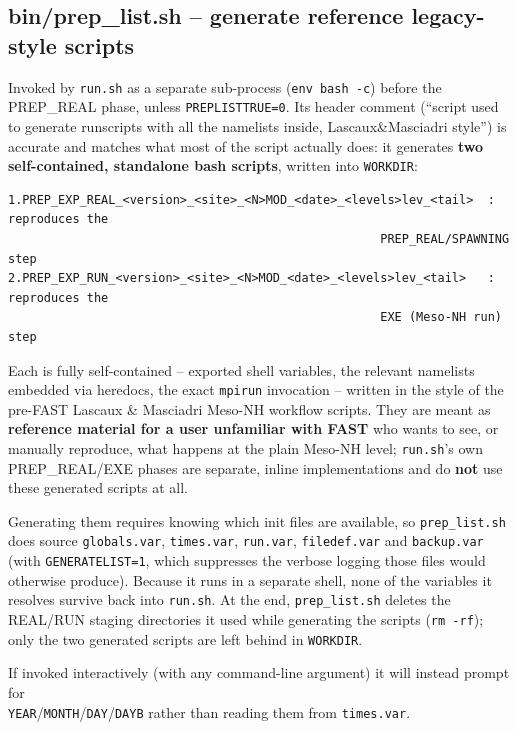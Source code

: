 \subsection{bin/prep\_list.sh -- generate reference legacy-style scripts}
Invoked by \texttt{run.sh} as a separate sub-process (\texttt{env bash -c}) before the PREP\_REAL phase,
unless \texttt{PREPLISTTRUE=0}. Its header comment (``script used to generate runscripts with all the
namelists inside, Lascaux\&Masciadri style'') is accurate and matches what most of the script actually
does: it generates \textbf{two self-contained, standalone bash scripts}, written into \texttt{WORKDIR}:
\begin{lstlisting}
1.PREP_EXP_REAL_<version>_<site>_<N>MOD_<date>_<levels>lev_<tail>  : reproduces the
                                                    PREP_REAL/SPAWNING step
2.PREP_EXP_RUN_<version>_<site>_<N>MOD_<date>_<levels>lev_<tail>   : reproduces the
                                                    EXE (Meso-NH run) step
\end{lstlisting}
Each is fully self-contained -- exported shell variables, the relevant namelists embedded via heredocs,
the exact \texttt{mpirun} invocation -- written in the style of the pre-FAST Lascaux \& Masciadri
Meso-NH workflow scripts. They are meant as \textbf{reference material for a user unfamiliar with FAST}
who wants to see, or manually reproduce, what happens at the plain Meso-NH level; \texttt{run.sh}'s own
PREP\_REAL/EXE phases are separate, inline implementations and do \textbf{not} use these generated
scripts at all.

Generating them requires knowing which init files are available, so \texttt{prep\_list.sh} does source
\texttt{globals.var}, \texttt{times.var}, \texttt{run.var}, \texttt{filedef.var} and \texttt{backup.var}
(with \texttt{GENERATELIST=1}, which suppresses the verbose logging those files would otherwise
produce). Because it runs in a separate shell, none of the variables it resolves survive back into \texttt{run.sh}. At the end, \texttt{prep\_list.sh} deletes the REAL/RUN staging directories it used while generating the scripts (\texttt{rm -rf}); only the two generated scripts are left behind in \texttt{WORKDIR}.

If invoked interactively (with any command-line argument) it will instead prompt for\\
\texttt{YEAR}/\texttt{MONTH}/\texttt{DAY}/\texttt{DAYB} rather than reading them from \texttt{times.var}.

